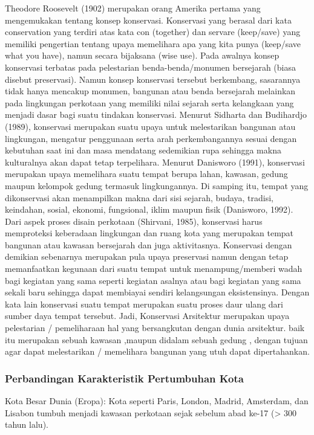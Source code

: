 \documentclass[../rumukota.tex]{subfiles}
\begin{document}
Theodore Roosevelt (1902) merupakan orang Amerika pertama yang mengemukakan tentang konsep konservasi. Konservasi yang berasal dari kata conservation yang terdiri atas kata con (together) dan servare (keep/save) yang memiliki pengertian tentang upaya memelihara apa yang kita punya (keep/save what you have), namun secara bijaksana (wise use).
Pada awalnya konsep konservasi terbatas pada pelestarian benda-benda/monumen bersejarah (biasa disebut preservasi). Namun konsep konservasi tersebut berkembang, sasarannya tidak hanya mencakup monumen, bangunan atau benda bersejarah melainkan pada lingkungan perkotaan yang memiliki nilai sejarah serta kelangkaan yang menjadi dasar bagi suatu tindakan konservasi.
Menurut Sidharta dan Budihardjo (1989), konservasi merupakan suatu upaya untuk melestarikan bangunan atau lingkungan, mengatur penggunaan serta arah perkembangannya sesuai dengan kebutuhan saat ini dan masa mendatang sedemikian rupa sehingga makna kulturalnya akan dapat tetap terpelihara.
Menurut Danisworo (1991), konservasi merupakan upaya memelihara suatu tempat berupa lahan, kawasan, gedung maupun kelompok gedung termasuk lingkungannya. Di samping itu, tempat yang dikonservasi akan menampilkan makna dari sisi sejarah, budaya, tradisi, keindahan, sosial, ekonomi, fungsional, iklim maupun fisik (Danisworo, 1992). Dari aspek proses disain perkotaan (Shirvani, 1985), konservasi harus memproteksi keberadaan lingkungan dan ruang kota yang merupakan tempat bangunan atau kawasan bersejarah dan juga aktivitasnya.
Konservasi dengan demikian sebenarnya merupakan pula upaya preservasi namun dengan tetap memanfaatkan kegunaan dari suatu tempat untuk menampung/memberi wadah bagi kegiatan yang sama seperti kegiatan asalnya atau bagi kegiatan yang sama sekali baru sehingga dapat membiayai sendiri kelangsungan eksistensinya. Dengan kata lain konservasi suatu tempat merupakan suatu proses daur ulang dari sumber daya tempat tersebut. Jadi, Konservasi Arsitektur merupakan upaya pelestarian / pemeliharaan hal yang bersangkutan dengan dunia arsitektur. baik itu merupakan sebuah kawasan ,maupun didalam sebuah gedung , dengan tujuan agar dapat melestarikan / memelihara bangunan yang utuh dapat dipertahankan.

\subsubsection{Perbandingan Karakteristik Pertumbuhan Kota}%
\label{sub:perbandingan_karakteristik_pertumbuhan_kota}

Kota Besar Dunia (Eropa): Kota seperti Paris, London, Madrid, Amsterdam, dan Lisabon tumbuh menjadi kawasan perkotaan sejak sebelum abad ke-17 (> 300 tahun lalu).
\end{document}
